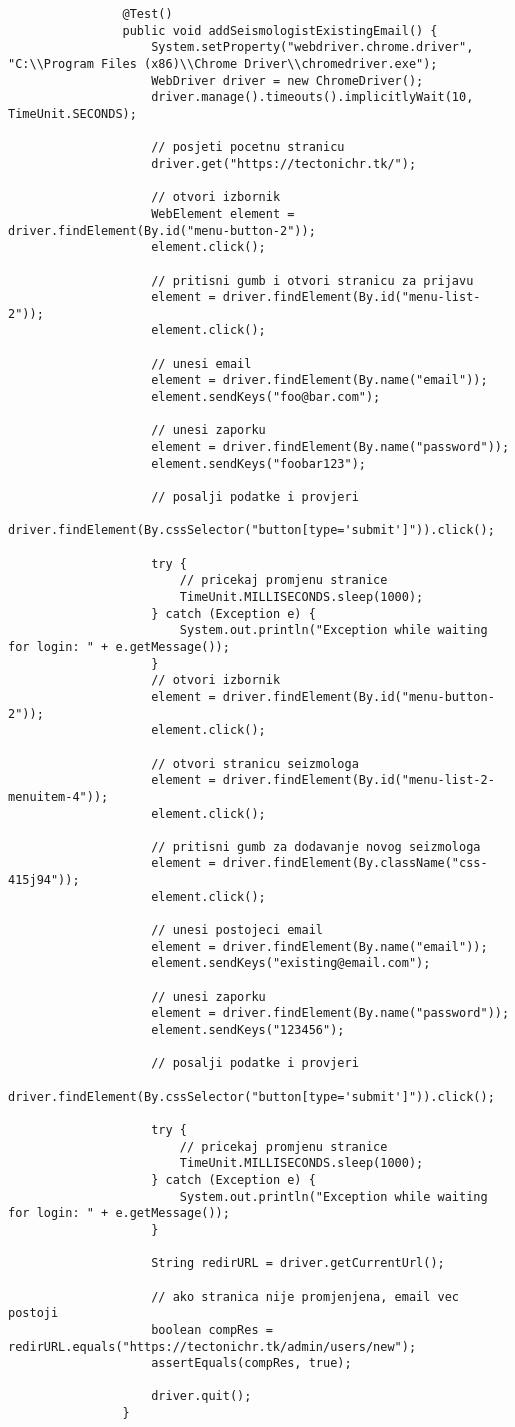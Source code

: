 			 \begin{lstlisting}
				@Test()
				public void addSeismologistExistingEmail() {
					System.setProperty("webdriver.chrome.driver", "C:\\Program Files (x86)\\Chrome Driver\\chromedriver.exe");
					WebDriver driver = new ChromeDriver();
					driver.manage().timeouts().implicitlyWait(10, TimeUnit.SECONDS);

					// posjeti pocetnu stranicu
					driver.get("https://tectonichr.tk/");

					// otvori izbornik
					WebElement element = driver.findElement(By.id("menu-button-2"));
					element.click();

					// pritisni gumb i otvori stranicu za prijavu
					element = driver.findElement(By.id("menu-list-2"));
					element.click();

					// unesi email
					element = driver.findElement(By.name("email"));
					element.sendKeys("foo@bar.com");

					// unesi zaporku
					element = driver.findElement(By.name("password"));
					element.sendKeys("foobar123");

					// posalji podatke i provjeri
					driver.findElement(By.cssSelector("button[type='submit']")).click();
					
					try {
						// pricekaj promjenu stranice
						TimeUnit.MILLISECONDS.sleep(1000);
					} catch (Exception e) {
						System.out.println("Exception while waiting for login: " + e.getMessage());
					}
					// otvori izbornik
					element = driver.findElement(By.id("menu-button-2"));
					element.click();

					// otvori stranicu seizmologa
					element = driver.findElement(By.id("menu-list-2-menuitem-4"));
					element.click();

					// pritisni gumb za dodavanje novog seizmologa
					element = driver.findElement(By.className("css-415j94"));
					element.click();

					// unesi postojeci email 
					element = driver.findElement(By.name("email"));
					element.sendKeys("existing@email.com");

					// unesi zaporku
					element = driver.findElement(By.name("password"));
					element.sendKeys("123456");
					
					// posalji podatke i provjeri
					driver.findElement(By.cssSelector("button[type='submit']")).click();
					
					try {
						// pricekaj promjenu stranice
						TimeUnit.MILLISECONDS.sleep(1000);
					} catch (Exception e) {
						System.out.println("Exception while waiting for login: " + e.getMessage());
					}
					
					String redirURL = driver.getCurrentUrl();

					// ako stranica nije promjenjena, email vec postoji
					boolean compRes = redirURL.equals("https://tectonichr.tk/admin/users/new");
					assertEquals(compRes, true);
					
					driver.quit();	
				}
			 \end{lstlisting}

